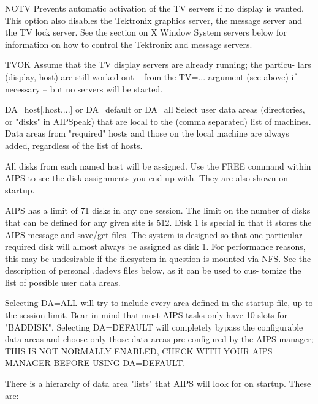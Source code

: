        NOTV    Prevents automatic activation of the  TV  servers  if  no  display  is
               wanted.   This option also disables the Tektronix graphics server, the
               message server and the TV lock server.  See the section  on  X  Window
               System  servers  below for information on how to control the Tektronix
               and message servers.

       TVOK    Assume that the TV display servers are already running;  the  particu-
               lars  (display, host) are still worked out -- from the TV=... argument
               (see above) if necessary -- but no servers will be started.

       DA=host[,host,...] or DA=default or DA=all
               Select user data areas (directories, or "disks" in AIPSpeak) that  are
               local  to  the  (comma  separated)  list of machines.  Data areas from
               "required" hosts and those on the  local  machine  are  always  added,
               regardless of the list of hosts.

               All disks from each named host will be assigned.  Use the FREE command
               within AIPS to see the disk assignments you end  up  with.   They  are
               also shown on startup.

               AIPS  has  a  limit  of 71 disks in any one session.  The limit on the
               number of disks that can be defined for any given site is 512.  Disk 1
               is special in that it stores the AIPS message and save/get files.  The
               system is designed so that one particular required  disk  will  almost
               always  be  assigned  as disk 1.  For performance reasons, this may be
               undesirable if the filesystem in question is mounted via NFS.  See the
               description of personal .dadevs files below, as it can be used to cus-
               tomize the list of possible user data areas.

               Selecting DA=ALL will try to include every area defined in the startup
               file, up to the session limit.  Bear in mind that most AIPS tasks only
               have 10 slots for  "BADDISK".   Selecting  DA=DEFAULT  will completely
               bypass the configurable data areas  and  choose only  those data areas
               pre-configured by the AIPS manager; THIS IS NOT NORMALLY ENABLED, CHECK
               WITH YOUR AIPS MANAGER BEFORE USING DA=DEFAULT.

               There  is  a hierarchy of data area "lists" that AIPS will look for on
               startup.  These are:

